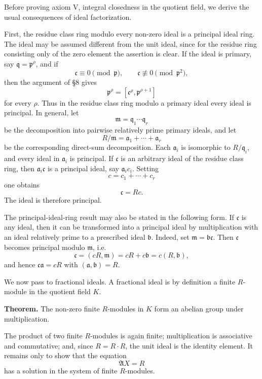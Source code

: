 \documentclass[11pt]{article}
\begin{document}
Before proving axiom V, integral closedness in the quotient field, we
derive the usual consequences of ideal factorization.

First, the residue class ring modulo every non-zero ideal is a principal
ideal ring. The ideal may be assumed different from the unit ideal,
since for the residue ring consisting only of the zero element the
assertion is clear. If the ideal is primary, say
\(\mathfrak q=\mathfrak p^{\rho}\), and if \[
  \mathfrak c\equiv0\pmod{\mathfrak p},
  \qquad \mathfrak c\not\equiv0\pmod{\mathfrak p^2},
\] then the argument of §8 gives \[
  \mathfrak p^{\rho}=[\mathfrak c^{\rho},\mathfrak p^{\rho+1}]
\] for every \(\rho\). Thus in the residue class ring modulo a primary
ideal every ideal is principal. In general, let \[
  \mathfrak m=\mathfrak q_1\cdots\mathfrak q_r
\] be the decomposition into pairwise relatively prime primary ideals,
and let \[
  R/\mathfrak m=\mathfrak a_1+\cdots+\mathfrak a_r
\] be the corresponding direct-sum decomposition. Each \(\mathfrak a_i\)
is isomorphic to \(R/\mathfrak q_i\), and every ideal in
\(\mathfrak a_i\) is principal. If \(\mathfrak c\) is an arbitrary ideal
of the residue class ring, then \(\mathfrak a_i\mathfrak c\) is a
principal ideal, say \(\mathfrak a_i c_i\). Setting \[
  c=c_1+\cdots+c_r
\] one obtains \[
  \mathfrak c=Rc.
\] The ideal is therefore principal.

The principal-ideal-ring result may also be stated in the following
form. If \(\mathfrak c\) is any ideal, then it can be transformed into a
principal ideal by multiplication with an ideal relatively prime to a
prescribed ideal \(\mathfrak b\). Indeed, set
\(\mathfrak m=\mathfrak b\mathfrak c\). Then \(\mathfrak c\) becomes
principal modulo \(\mathfrak m\), i.e. \[
  \mathfrak c=(cR,\mathfrak m)=cR+c\mathfrak b=c(R,\mathfrak b),
\] and hence \(\mathfrak c\mathfrak a=cR\) with
\((\mathfrak a,\mathfrak b)=R\).

We now pass to fractional ideals. A fractional ideal is by definition a
finite \(R\)-module in the quotient field \(K\).

\textbf{Theorem.} The non-zero finite \(R\)-modules in \(K\) form an
abelian group under multiplication.

The product of two finite \(R\)-modules is again finite; multiplication
is associative and commutative; and, since \(R=R\cdot R\), the unit
ideal is the identity element. It remains only to show that the equation
\[
  \mathfrak A X=R
\] has a solution in the system of finite \(R\)-modules.
\end{document}
